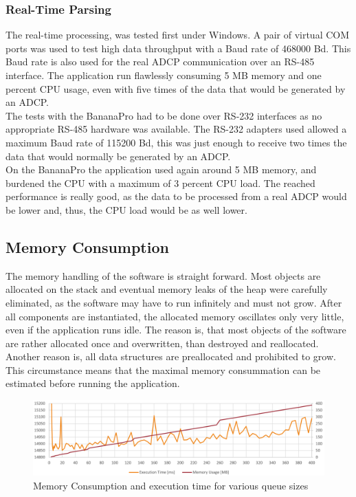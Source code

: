 \subsubsection{Real-Time Parsing} 
The real-time processing, was tested first under Windows. A pair of virtual COM ports was used to test high data throughput with a Baud rate of 468000 Bd. This Baud rate is also used for the real ADCP communication over an RS-485 interface. The application run flawlessly consuming 5 MB memory and one percent CPU usage, even with five times of the data that would be generated by an ADCP.\\
The tests with the BananaPro had to be done over RS-232 interfaces as no appropriate RS-485 hardware was available. The RS-232 adapters used allowed a maximum Baud rate of 115200 Bd, this was just enough to receive two times the data that would normally be generated by an ADCP.\\
On the BananaPro the application used again around 5 MB memory, and burdened the CPU with a maximum of 3 percent CPU load. The reached performance is really good, as the data to be processed from a real ADCP would be lower and, thus, the CPU load would be as well lower.
\subsection{Memory Consumption}
The memory handling of the software is straight forward. Most objects are allocated on the stack and eventual memory leaks of the heap were carefully eliminated, as the software may have to run infinitely and must not grow. After all components are instantiated, the allocated memory oscillates only very little, even if the application runs idle. The reason is, that most objects of the software are rather allocated once and overwritten, than destroyed and reallocated. Another reason is, all data structures are preallocated and prohibited to grow. This circumstance means that the maximal memory consummation can be estimated before running the application.\\
\begin{figure}[h]
\centering
      \includegraphics[width=1\textwidth]{perf_mem_2}
        \caption{Memory Consumption and execution time for various queue sizes}
\end{figure}

